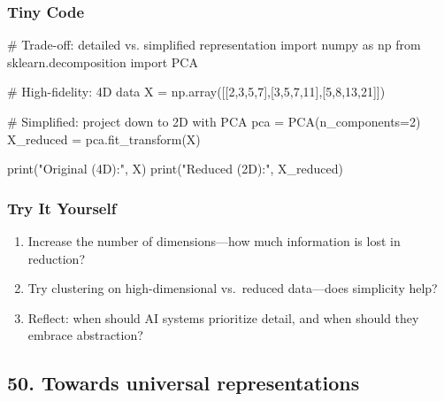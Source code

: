 \documentclass[
  letterpaper,
  DIV=11,
  numbers=noendperiod]{scrreprt}
\newenvironment{Shaded}{\begin{snugshade}}{\end{snugshade}}
\newcommand{\BuiltInTok}[1]{\textcolor[rgb]{0.00,0.23,0.31}{#1}}
\newcommand{\CommentTok}[1]{\textcolor[rgb]{0.37,0.37,0.37}{#1}}
\newcommand{\DecValTok}[1]{\textcolor[rgb]{0.68,0.00,0.00}{#1}}
\newcommand{\ImportTok}[1]{\textcolor[rgb]{0.00,0.46,0.62}{#1}}
\newcommand{\NormalTok}[1]{\textcolor[rgb]{0.00,0.23,0.31}{#1}}
\newcommand{\OperatorTok}[1]{\textcolor[rgb]{0.37,0.37,0.37}{#1}}
\newcommand{\StringTok}[1]{\textcolor[rgb]{0.13,0.47,0.30}{#1}}
\providecommand{\tightlist}{%
  \setlength{\itemsep}{0pt}\setlength{\parskip}{0pt}}
\begin{document}
\subsubsection{Tiny Code}\label{tiny-code-48}

\begin{Shaded}
\begin{Highlighting}[]
\CommentTok{\# Trade{-}off: detailed vs. simplified representation}
\ImportTok{import}\NormalTok{ numpy }\ImportTok{as}\NormalTok{ np}
\ImportTok{from}\NormalTok{ sklearn.decomposition }\ImportTok{import}\NormalTok{ PCA}

\CommentTok{\# High{-}fidelity: 4D data}
\NormalTok{X }\OperatorTok{=}\NormalTok{ np.array([[}\DecValTok{2}\NormalTok{,}\DecValTok{3}\NormalTok{,}\DecValTok{5}\NormalTok{,}\DecValTok{7}\NormalTok{],[}\DecValTok{3}\NormalTok{,}\DecValTok{5}\NormalTok{,}\DecValTok{7}\NormalTok{,}\DecValTok{11}\NormalTok{],[}\DecValTok{5}\NormalTok{,}\DecValTok{8}\NormalTok{,}\DecValTok{13}\NormalTok{,}\DecValTok{21}\NormalTok{]])}

\CommentTok{\# Simplified: project down to 2D with PCA}
\NormalTok{pca }\OperatorTok{=}\NormalTok{ PCA(n\_components}\OperatorTok{=}\DecValTok{2}\NormalTok{)}
\NormalTok{X\_reduced }\OperatorTok{=}\NormalTok{ pca.fit\_transform(X)}

\BuiltInTok{print}\NormalTok{(}\StringTok{"Original (4D):"}\NormalTok{, X)}
\BuiltInTok{print}\NormalTok{(}\StringTok{"Reduced (2D):"}\NormalTok{, X\_reduced)}
\end{Highlighting}
\end{Shaded}

\subsubsection{Try It Yourself}\label{try-it-yourself-48}

\begin{enumerate}
\def\labelenumi{\arabic{enumi}.}
\tightlist
\item
  Increase the number of dimensions---how much information is lost in
  reduction?
\item
  Try clustering on high-dimensional vs.~reduced data---does simplicity
  help?
\item
  Reflect: when should AI systems prioritize detail, and when should
  they embrace abstraction?
\end{enumerate}

\subsection{50. Towards universal
representations}\label{towards-universal-representations}
\end{document}
